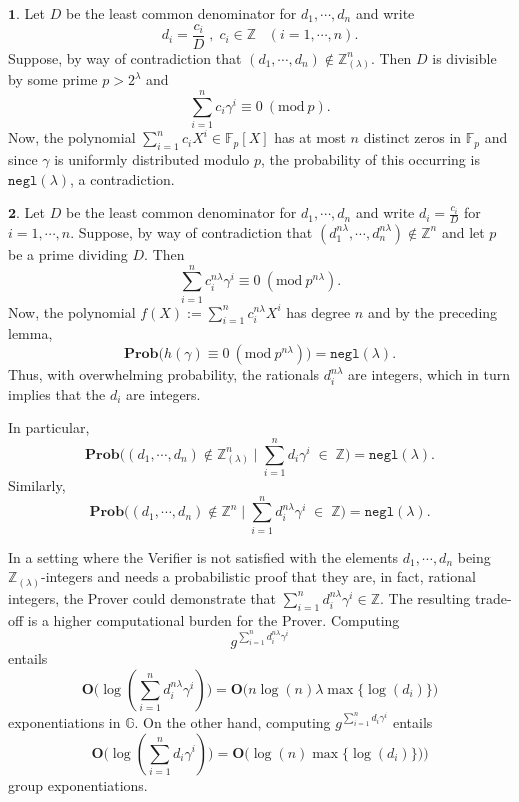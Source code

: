 \documentclass[11pt, lettersize, notitlepage, leqno, footskip=0.6cm]{article}
\newcommand{\bz}{\mathbb Z}
\newcommand{\bFp}{\mathbb{F}_p}
\newcommand{\slim}{\sum\limits}
\newcommand{\ttt}{\texttt}
\newcommand{\negl}{\ttt{{negl}}}
\newcommand{\mb}{\mathbb}
\newcommand{\mbf}{\mathbf}
\newcommand{\lam}{\lambda}
\newcommand{\lamb}{\lambda}
\newcommand{\bzlam}{\bz_{(\lam)}}
\newcommand{\Prob}{\mbf{Prob}}
\newcommand{\vs}{\vspace{-0.15cm}}
\newcommand{\noin}{\noindent}
\newcommand{\op}{overwhelming probability}
\newcommand{\Mod}[1]{\ (\mathrm{mod}\ #1)}
\numberwithin{equation}{section}
\begin{document}
\begin{prf} $\mbf{1}$. Let $D$ be the least common denominator for $d_1,\cdots, d_n$ and write \vs $$d_i = \frac{c_i}{D}\;,\; c_i\in\bz\; \;\;(i=1,\cdots, n).$$ Suppose, by way of contradiction that $(d_1,\cdots, d_n )\notin \bzlam^n$. Then $D$ is divisible by some prime $p>2^{\lam}$ and \vs $$\sum\limits_{i=1}^n  {c_i\gamma^i} \equiv 0\Mod{p}.$$ Now, the polynomial $\sum\limits_{i=1}^n c_iX^i \in \bFp[X]$ has at most $n$ distinct zeros in $\bFp$ and since $\gamma$ is uniformly distributed modulo $p$, the probability of this occurring is $\negl(\lamb)$, a contradiction.\vspace{0.15cm} 

\noin $\mbf{2}$. Let $D$ be the least common denominator for $d_1,\cdots, d_n$ and write $d_i = \frac{c_i}{D}$ for $i=1,\cdots, n.$ Suppose, by way of contradiction that $(d_1^{n\lam},\cdots, d_n^{n\lam} )\notin \bz^n$ and let $p$ be a prime dividing $D$. Then $$\slim_{i=1}^n c_i^{n\lam}\gamma^i \equiv 0\Mod{p^{n\lam}}.$$ Now, the polynomial $f(X):= \slim_{i=1}^n c_i^{n\lam} X^i$ has degree $n$ and by the preceding lemma, \vs $$\mbf{Prob}\big(h(\gamma)\equiv 0\Mod{p^{n\lam}} \big) = \negl(\lam).$$ Thus, with \op, the rationals $d_i^{n\lam}$ are integers, which in turn implies that the $d_i$ are integers.\end{prf}


\begin{comment}
For the second part, note that \vs $$\Prob\big(\sum\limits_{i=1}^n d_i\gamma_j^i\in \bz\;\forall j\big|\; (d_1,\cdots,d_n)\notin \bz\big ) = \Prob\big(\sum\limits_{i=1}^n d_i\gamma^i\in \bz\big|\; (d_1,\cdots,d_n)\notin \bz\big )^{\lam} = \negl(\lam).$$\end{comment}

\noindent In particular, \vs $$\mbf{Prob}\big((d_1,\cdots, d_n)\notin \bzlam^n \;\Big|\;\sum\limits_{i=1}^n d_i\gamma^i\; \in \;\bz \big) = \negl(\lamb).$$ Similarly, \vs $$ \mbf{Prob}\big((d_1,\cdots, d_n)\notin \bz^n \;\Big|\;\sum\limits_{i=1}^n d_i^{n\lam}\gamma^i\; \in \;\bz \big) = \negl(\lamb). $$


In a setting where the Verifier is not satisfied with the elements $d_1,\cdots, d_n$ being $\bzlam$-integers and needs a probabilistic proof that they are, in fact, rational integers, the Prover could demonstrate that $\sum\limits_{i=1}^n d_i^{n\lam}\gamma^i\in \bz$. The resulting trade-off is a higher computational burden for the Prover. Computing \vs $$g^{\slim_{i=1}^n d_i^{n\lam} \gamma^i}$$ entails \vs $$\mbf{O}\big(\log(\slim_{i=1}^n d_i^{n\lam} \gamma^i)\big) = \mbf{O}\big(n\log(n)\lam\max\{\log(d_i)\}\big) $$ exponentiations in $\mb{G}$. On the other hand, computing $g^{\slim_{i=1}^n d_i\gamma^i}$ entails \vs $$\mbf{O}\big(\log(\slim_{i=1}^n d_i\gamma^i)\big) = \mbf{O}\big(\log(n)\max\{\log(d_i)\}) \big)$$ group exponentiations.
\end{document}
